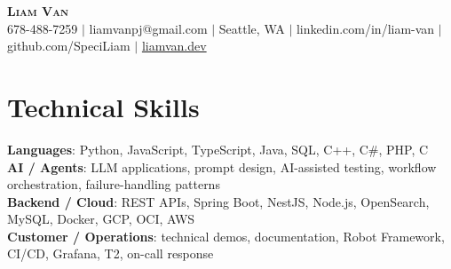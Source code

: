 \documentclass[letterpaper,11pt]{article}
\begin{document}

%
\begin{center}
    \textbf{\Huge \scshape Liam Van} \\ \vspace{1pt}
    \small 678-488-7259 $|$ \small {liamvanpj@gmail.com} $|$ Seattle, WA
 {{$|$ linkedin.com/in/liam-van} {$|$ github.com/SpeciLiam} {$|$ \href{https://liamvan.dev}{liamvan.dev}}}

\end{center}

\section{Technical Skills}
 \begin{itemize}[leftmargin=0.15in, label={}]
    \small{\item{
     \textbf{Languages}{: Python, JavaScript, TypeScript, Java, SQL, C++, C\#, PHP, C} \\
     \textbf{AI / Agents}{: LLM applications, prompt design, AI-assisted testing, workflow orchestration, failure-handling patterns} \\
     \textbf{Backend / Cloud}{: REST APIs, Spring Boot, NestJS, Node.js, OpenSearch, MySQL, Docker, GCP, OCI, AWS} \\
     \textbf{Customer / Operations}{: technical demos, documentation, Robot Framework, CI/CD, Grafana, T2, on-call response} \\
    }}
 \end{itemize}
%

\end{document}
